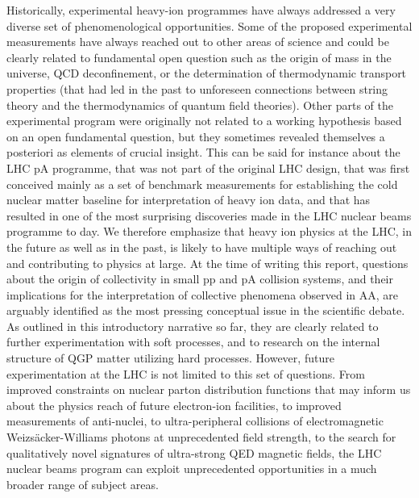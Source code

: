 \documentclass[../report.tex]{subfiles}
\begin{document}
Historically, experimental heavy-ion programmes have always addressed a very diverse set of phenomenological opportunities. Some of the proposed experimental measurements have always reached out to other areas of science and could be clearly related to fundamental open question such as the origin of mass in the universe, QCD deconfinement, or the determination of thermodynamic transport properties (that had led in the past to unforeseen connections between string theory and the thermodynamics of quantum field theories). Other parts of the experimental program were originally not related to a working hypothesis based on an open fundamental question, but they sometimes revealed themselves a posteriori as elements of crucial insight. This can be said for instance about the LHC pA programme, that was not part of the original LHC design, that was first conceived mainly as a set of benchmark measurements for establishing the cold nuclear matter baseline for interpretation of heavy ion data, and that has resulted in one of the most surprising discoveries made in the LHC nuclear beams programme to day. We therefore emphasize that heavy ion physics at the LHC, in the future as well as in the past, is likely to have multiple ways of reaching out and contributing to physics at large. At the time of writing this report, questions about the origin of collectivity in small pp and pA collision systems, and their implications for the interpretation of collective phenomena observed in AA, are arguably identified as the most pressing conceptual issue in the scientific debate. As outlined in this introductory narrative so far, they are clearly related to further experimentation with soft processes, and to research on the internal structure of QGP matter utilizing hard processes.  However, future experimentation at the LHC is not limited to this set of questions. From improved constraints on nuclear parton distribution functions that may inform us about the physics reach of future electron-ion facilities, to improved measurements of anti-nuclei, to ultra-peripheral collisions of electromagnetic Weizsäcker-Williams photons at unprecedented field strength, to the search for qualitatively novel signatures of ultra-strong QED magnetic fields, the LHC nuclear beams program can exploit unprecedented opportunities in a much broader range of subject areas. 
\end{document}
